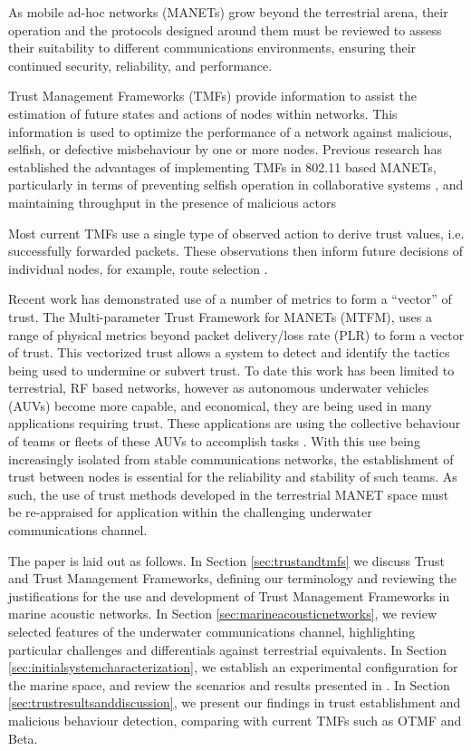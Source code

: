 \documentclass[runningheads,a4paper]{llncs}
\begin{document}
As mobile ad-hoc networks (MANETs) grow beyond the terrestrial arena, their operation and the protocols designed around them must be reviewed to assess their suitability to different communications environments, ensuring their continued security, reliability, and performance.

Trust Management Frameworks (TMFs) provide information to assist the estimation of future states and actions of nodes within networks.
This information is used to optimize the performance of a network against malicious, selfish, or defective misbehaviour by one or more nodes.
Previous research has established the advantages of implementing TMFs in 802.11 based MANETs, particularly in terms of preventing selfish operation in collaborative systems \cite{Li2007}, and maintaining throughput in the presence of malicious actors \cite{Buchegger2002}

Most current TMFs use a single type of observed action to derive trust values, i.e. successfully forwarded packets. These observations then inform future decisions of individual nodes, for example, route selection \cite{Li2008}.

Recent work has demonstrated use of a number of metrics to form a ``vector'' of trust.
The Multi-parameter Trust Framework for MANETs (MTFM)\cite{Guo11}, uses a range of physical metrics beyond packet delivery/loss rate (PLR) to form a vector of trust.
This vectorized trust allows a system to detect and identify the tactics being used to undermine or subvert trust.
To date this work has been limited to terrestrial, RF based networks, however as autonomous underwater vehicles (AUVs) become more capable, and economical, they are being used in many applications requiring trust.
These applications are using the collective behaviour of teams or fleets of these AUVs to accomplish tasks \cite{Caiti2011}.
With this use being increasingly isolated from stable communications networks, the establishment of trust between nodes is essential for the reliability and stability of such teams.
As such, the use of trust methods developed in the terrestrial MANET space must be re-appraised for application within the challenging underwater communications channel.

The paper is laid out as follows.
In Section \ref{sec:trustandtmfs} we discuss Trust and Trust Management Frameworks, defining our terminology and reviewing the justifications for the use and development of Trust Management Frameworks in marine acoustic networks.
In Section \ref{sec:marineacousticnetworks}, we review selected features of the underwater communications channel, highlighting particular challenges and differentials against terrestrial equivalents.
In Section \ref{sec:initialsystemcharacterization}, we establish an experimental configuration for the marine space, and review the scenarios and results presented in \cite{Guo11}.
In Section \ref{sec:trustresultsanddiscussion}, we present our findings in trust establishment and malicious behaviour detection, comparing with current TMFs such as OTMF and Beta.
\end{document}
